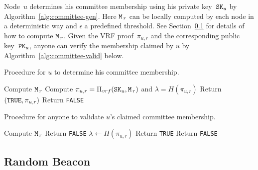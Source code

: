 \documentclass{article}
\begin{document}
Node~$u$ determines his committee membership using his private key~${\tt SK}_u$ by Algorithm~\ref{alg:committee-gen}. Here ${\tt M}_{\,r}$ can be locally computed by each node in a deterministic way and $\epsilon$ a predefined threshold. See Section~\ref{sec:beacon} for details of how to compute ${\tt M}_{\,r}$. Given the VRF proof~$\pi_{u,r}$ and the corresponding public key~${\tt PK}_u$, anyone can verify the membership claimed by $u$ by Algorithm~\ref{alg:committee-valid} below.

\begin{algorithm}[H]
\caption{Procedure for $u$ to determine his committee membership. }
\label{alg:committee-gen}
\begin{spacing}{1.2}
\begin{algorithmic}[1]
    \vspace{1ex}
    \State Compute ${\tt M}_{\,r}$
    \State Compute $\pi_{u,r} = \Pi_{vrf}({\tt SK}_u,{\tt M}_{\,r})$ and $\lambda=H\left(\pi_{u,r}\right)$
    \vspace{1ex}
    \If{$\lambda\leq\epsilon$}
        \State Return $\left({\tt TRUE},\pi_{u,r}\right)$
    \Else 
        \State Return {\tt FALSE}
    \EndIf
\end{algorithmic}
\end{spacing}
\end{algorithm}

\begin{algorithm}[H]
\caption{Procedure for anyone to validate $u$'s claimed committee membership.}
\label{alg:committee-valid}
\begin{spacing}{1.2}
\begin{algorithmic}[1]
    \vspace{1ex}
    \State Compute ${\tt M}_{\,r}$
    \vspace{1ex}
        \State Return {\tt FALSE}
    \EndIf
    \vspace{1ex}
    \State $\lambda\leftarrow H(\pi_{u,r})$
    \vspace{1ex}
    \If{$\lambda\leq\epsilon$}
        \State Return {\tt TRUE}
    \Else 
        \State Return {\tt FALSE}
    \EndIf
\end{algorithmic}
\end{spacing}
\end{algorithm}

\subsection{Random Beacon}
\label{sec:beacon}
\end{document}
